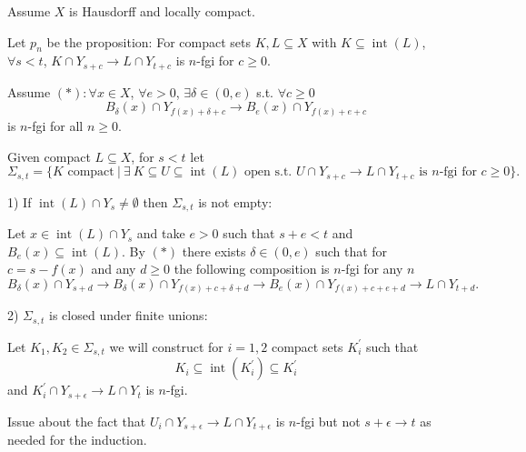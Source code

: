 \documentclass{amsart}
\theoremstyle{definition}
\newcommand{\R}{\mathbb{R}}
\DeclareMathOperator{\im}{im}
\DeclareMathOperator{\interior}{int}
\begin{document}
\newpage

Assume $X$ is Hausdorff and locally compact.

Let $p_n$ be the proposition: For compact sets $K, L \subseteq X$ with $K \subseteq \interior(L)$, $\forall s < t$, $K \cap Y_{s+c} \to L \cap Y_{t+c}$ is $n$-fgi for $c \geq 0$.

Assume $(\ast): \forall x \in X$, $\forall e > 0$, $\exists \delta \in (0,e)$ s.t. $\forall c \geq 0$
\begin{equation*}
B_\delta(x) \cap Y_{f(x)+\delta+c} \to B_e(x) \cap Y_{f(x)+e+c}
\end{equation*} 
is $n$-fgi for all $n \geq 0$.

Given compact $L \subseteq X$, for $s < t$ let
\begin{equation*}
\Sigma_{s,t} = \{K \text{ compact}\ |\ \exists\ K \subseteq U \subseteq \interior(L) \text{ open s.t. } U \cap Y_{s+c} \to L \cap Y_{t+c} \text{ is $n$-fgi for } c\geq 0\}.
\end{equation*}

1) If $\interior(L) \cap Y_s \neq \emptyset$ then $\Sigma_{s, t}$ is not empty:

Let $x \in \interior(L) \cap Y_{s}$ and take $e > 0$ such that $s + e < t$ and $B_e(x) \subseteq \interior(L)$.
By $(\ast)$ there exists $\delta \in (0, e)$ such that for $c = s - f(x)$ and any $d \geq 0$ the following composition is $n$-fgi for any $n$
\begin{equation*}
B_\delta(x) \cap Y_{s + d} \to
B_\delta(x) \cap Y_{f(x) + c + \delta + d} \to
B_e(x) \cap Y_{f(x) + c + e + d} \to
L \cap Y_{t + d}.
\end{equation*}  

2) $\Sigma_{s,t}$ is closed under finite unions:

Let $K_1, K_2 \in \Sigma_{s,t}$ we will construct for $i=1, 2$ compact sets $K_i^\prime$ such that
\begin{equation*}
K_i \subseteq \interior(K_i^\prime) \subseteq K_i^\prime
\end{equation*}
and $K_i^\prime \cap Y_{s+\epsilon} \to L \cap Y_t$ is $n$-fgi.

Issue about the fact that $U_i \cap Y_{s+\epsilon} \to L \cap Y_{t+\epsilon}$ is $n$-fgi but not $s+\epsilon \to t$ as needed for the induction.

\newpage

%	
%	
%	
%	
	
\end{document}
